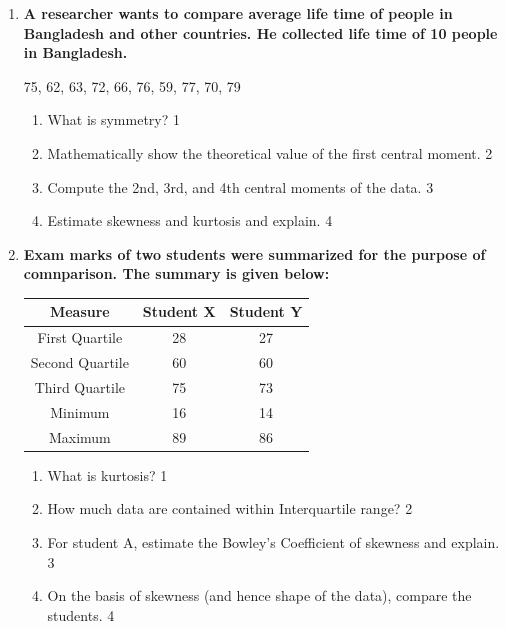 \documentclass[a4paper,oneside]{book}
\begin{document}
\begin{enumerate}
  
   \item
	  \textbf{A researcher wants to compare average life time of people in Bangladesh and other countries. He collected life time of 10 people in Bangladesh.} 
	  
	  	\begin{center}
	  75, 62, 63, 72, 66, 76, 59, 77, 70, 79
	  	\end{center}
  
  \begin{enumerate}
    \item
	What is symmetry? \hfill 1
    \item
	Mathematically show the theoretical value of the first central moment. \hfill 2
    \item  
	Compute the 2nd, 3rd, and 4th central moments of the data. \hfill 3
    \item
	Estimate skewness and kurtosis and explain. \hfill 4
  \end{enumerate}
  
   \item
	  \textbf{Exam marks of two students were summarized for the purpose of comnparison. The summary is given below:} 
	  
	  \begin{table}[h]
	  \centering
\begin{tabular}{c|c|c}
Measure         & Student X & Student Y \\ \hline
First Quartile  & 28        & 27        \\
Second Quartile & 60        & 60        \\
Third Quartile  & 75        & 73        \\
Minimum         & 16        & 14        \\ 
Maximum         & 89        & 86        \\  \hline
\end{tabular}
\end{table}
  
  \begin{enumerate}
    \item
	What is kurtosis? \hfill 1
    \item
	How much data are contained within Interquartile range? \hfill 2
    \item  
	For student A, estimate the Bowley's Coefficient of skewness and explain. \hfill 3
    \item
	On the basis of skewness (and hence shape of the data), compare the students. \hfill 4
  \end{enumerate}

\end{enumerate}
\end{document}
